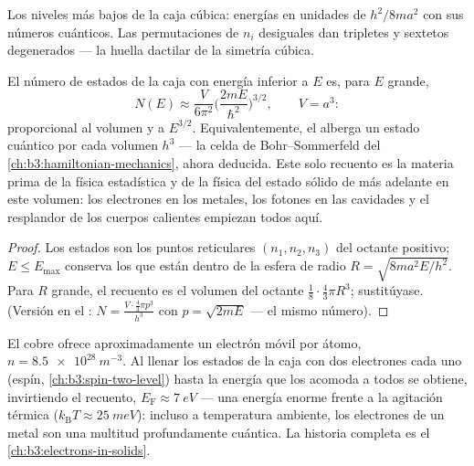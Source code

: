 \begin{omfigure}

{\small Los niveles más bajos de la caja cúbica: energías en unidades de
$h^2/8ma^2$ con sus números cuánticos. Las permutaciones de $n_i$
desiguales dan tripletes y sextetos degenerados --- la huella dactilar de la
simetría cúbica.}
\end{omfigure}

\begin{proposition}\label{prop:b3:schrodinger-three-dimensions:counting}
El número de estados de la caja con energía inferior a $E$ es, para $E$ grande,
\[
N(E) \approx \frac{V}{6\pi^2}\Big(\frac{2mE}{\hbar^2}\Big)^{3/2} ,
\qquad V = a^3 :
\]
proporcional al volumen y a $E^{3/2}$. Equivalentemente, el 
alberga un estado cuántico por cada volumen $h^3$ --- la celda de
Bohr--Sommerfeld del
\cref{ch:b3:hamiltonian-mechanics}, ahora deducida. Este solo recuento
es la materia prima de la física estadística y de la física del estado
sólido de más adelante en este volumen: los electrones en los metales, los
fotones en las cavidades y el resplandor de los cuerpos calientes empiezan
todos aquí.
\end{proposition}

\begin{proof}
Los estados son los puntos reticulares $(n_1, n_2, n_3)$ del octante
positivo; $E \le E_{\max}$ conserva los que están dentro de la esfera de radio $R =
\sqrt{8ma^2E/h^2}$. Para $R$ grande, el recuento es el volumen
del octante $\tfrac18\cdot\tfrac43\pi R^3$; sustitúyase. (Versión en el
: $N = \tfrac{V\cdot\frac43\pi p^3}{h^3}$ con $p = \sqrt{2mE}$ ---
el mismo número).
\end{proof}

\begin{example}\label{ex:b3:schrodinger-three-dimensions:metal}
El cobre ofrece aproximadamente un electrón móvil por átomo, $n =
\qty{8.5e28}{m^{-3}}$. Al llenar los estados de la caja con dos electrones
cada uno (espín, \cref{ch:b3:spin-two-level}) hasta la energía que los
acomoda a todos se obtiene, invirtiendo el recuento, $E_{\text{F}}
\approx \qty{7}{eV}$ --- una energía enorme frente a la agitación térmica
($k_{\text{B}}T \approx \qty{25}{meV}$): incluso a temperatura ambiente, los
electrones de un metal son una multitud profundamente cuántica. La historia
completa es el \cref{ch:b3:electrons-in-solids}.
\end{example}

